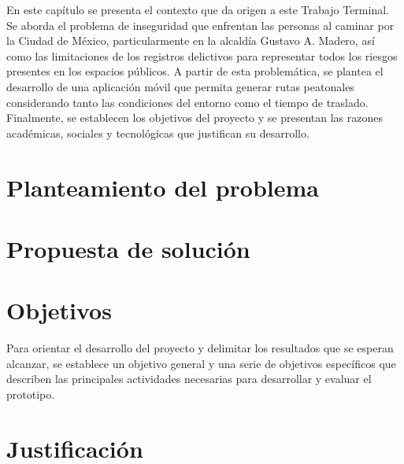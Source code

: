 En este capítulo se presenta el contexto que da origen a este Trabajo Terminal. Se aborda el problema de inseguridad que enfrentan las personas al caminar por la Ciudad de México, particularmente en la alcaldía Gustavo A. Madero, así como las limitaciones de los registros delictivos para representar todos los riesgos presentes en los espacios públicos. A partir de esta problemática, se plantea el desarrollo de una aplicación móvil que permita generar rutas peatonales considerando tanto las condiciones del entorno como el tiempo de traslado. Finalmente, se establecen los objetivos del proyecto y se presentan las razones académicas, sociales y tecnológicas que justifican su desarrollo.

\section{Planteamiento del problema}
\label{sec:planteamiento_problema}


\section{Propuesta de solución}
\label{sec:propuesta_solucion}



\section{Objetivos}
Para orientar el desarrollo del proyecto y delimitar los resultados que se esperan alcanzar, se establece un objetivo general y una serie de objetivos específicos que describen las principales actividades necesarias para desarrollar y evaluar el prototipo.

\label{sec:objetivos}


\section{Justificación}
\label{sec:justificacion}

